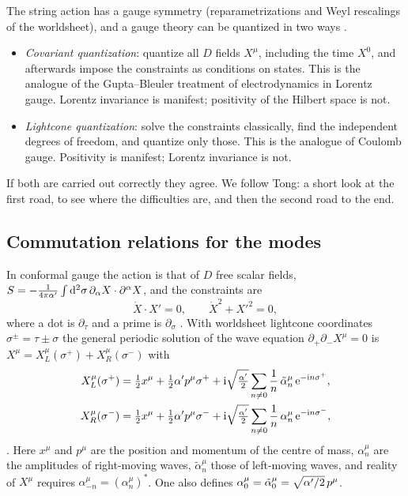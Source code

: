 The string action has a gauge symmetry (reparametrizations and Weyl rescalings of the
worldsheet), and a gauge theory can be quantized in two ways .
\begin{itemize}[leftmargin=*]
\item \emph{Covariant quantization}: quantize all $D$ fields
$X^\mu$, including the time $X^0$, and afterwards impose the constraints as conditions on
states. This is the analogue of the Gupta--Bleuler treatment of electrodynamics in Lorentz
gauge. Lorentz invariance is manifest; positivity of the Hilbert space is not.
\item \emph{Lightcone quantization}: solve the constraints
classically, find the independent degrees of freedom, and quantize only those. This is the
analogue of Coulomb gauge. Positivity is manifest; Lorentz invariance is not.
\end{itemize}
If both are carried out correctly they agree. We follow Tong: a short look at the first
road, to see where the difficulties are, and then the second road to the end.

\subsection{Commutation relations for the modes}

In conformal gauge the action is that of $D$ free scalar fields,
$S=-\frac{1}{4\pi\alpha'}\int\mathrm{d}^2\sigma\,\partial_\alpha X\cdot\partial^\alpha X$, and the
constraints are
\begin{equation}\label{eq:quantum:constraints}
  \dot X\cdot X'=0,\qquad \dot X^2+X'^2=0 ,
\end{equation}
where a dot is $\partial_\tau$ and a prime is $\partial_\sigma$
. With worldsheet lightcone coordinates
$\sigma^\pm=\tau\pm\sigma$ the general periodic solution of the wave equation
$\partial_+\partial_-X^\mu=0$ is $X^\mu=X^\mu_L(\sigma^+)+X^\mu_R(\sigma^-)$ with
\begin{equation}\label{eq:quantum:modes}
\begin{aligned}
 X_L^\mu(\sigma^+)&=\tfrac12x^\mu+\tfrac12\alpha' p^\mu\sigma^+
   +\mathrm{i}\sqrt{\tfrac{\alpha'}{2}}\sum_{n\neq0}\frac1n\,\tilde\alpha^\mu_n\,\mathrm{e}^{-\mathrm{i} n\sigma^+},\\
 X_R^\mu(\sigma^-)&=\tfrac12x^\mu+\tfrac12\alpha' p^\mu\sigma^-
   +\mathrm{i}\sqrt{\tfrac{\alpha'}{2}}\sum_{n\neq0}\frac1n\,\alpha^\mu_n\,\mathrm{e}^{-\mathrm{i} n\sigma^-},
\end{aligned}
\end{equation}
. Here $x^\mu$ and $p^\mu$ are the position and momentum of
the centre of mass, $\alpha_n^\mu$ are the amplitudes of right-moving waves,
$\tilde\alpha_n^\mu$ those of left-moving waves, and reality of $X^\mu$ requires
$\alpha_{-n}^\mu=(\alpha_n^\mu)^*$. One also defines
$\alpha_0^\mu=\tilde\alpha_0^\mu=\sqrt{\alpha'/2}\,p^\mu$.

